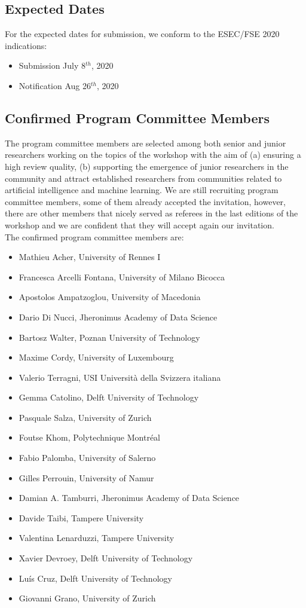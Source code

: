 \subsection{Expected Dates}
For the expected dates for submission, we conform to the ESEC/FSE 2020 indications:
\begin{itemize}[itemsep=0.5em]
	\item Submission July 8$^{th}$, 2020
	\item Notification Aug 26$^{th}$, 2020
\end{itemize}


\subsection{Confirmed Program Committee Members}
The program committee members are selected among both senior and junior researchers working on the topics of the workshop with the aim of (a) ensuring a high review quality, (b) supporting the emergence of junior researchers in the community and attract established researchers from communities related to artificial intelligence and machine learning.
We are still recruiting program committee members, some of them already accepted the invitation, however, there are other members that nicely served as referees in the last editions of the workshop and we are confident that they will accept again our invitation.\\
The confirmed program committee members are:
\begin{itemize}[itemsep=0.5em]
	
	\item Mathieu Acher, University of Rennes I
	\item Francesca Arcelli Fontana, University of  Milano Bicocca
	\item Apostolos Ampatzoglou, University of Macedonia
	\item Dario Di Nucci, Jheronimus Academy of Data Science
	\item Bartosz Walter, Poznan University of Technology
	\item Maxime Cordy, University of Luxembourg
	\item Valerio Terragni, USI Università della Svizzera italiana
	\item Gemma Catolino, Delft University of Technology
	\item Pasquale Salza, University of Zurich
	\item Foutse Khom, Polytechnique Montréal
	\item Fabio Palomba, University of Salerno
	\item Gilles Perrouin, University of Namur
	\item Damian A. Tamburri, Jheronimus Academy of Data Science
	\item Davide Taibi, Tampere University
	\item Valentina Lenarduzzi, Tampere University
	\item Xavier Devroey, Delft University of Technology
	\item Luís Cruz, Delft University of Technology
	\item Giovanni Grano, University of Zurich
    
	
\end{itemize}
	
